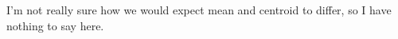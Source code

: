 \documentclass{article}
\begin{document}
\begin{enumerate}
\begin{enumerate}
    I'm not really sure how we would expect mean and centroid to
    differ, so I have nothing to say here.
  \end{enumerate}

\end{enumerate}
\end{document}
